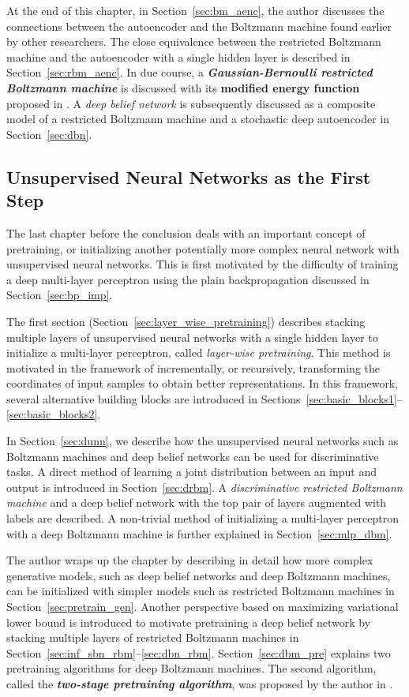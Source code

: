 \documentclass[dissertation,nocontribution,draft*]{aaltoseries}
\begin{document}
At the end of this chapter, in Section~\ref{sec:bm_aenc},
the author discusses the connections between the autoencoder
and the Boltzmann machine found earlier by other
researchers. The close equivalence between the restricted
Boltzmann machine and the autoencoder with a single hidden
layer is described in Section~\ref{sec:rbm_aenc}. In due
course, a \textbf{\textit{Gaussian-Bernoulli restricted
Boltzmann machine}} is discussed with its \textbf{modified
energy function} proposed in . A
\textit{deep belief network} is subsequently discussed as a
composite model of a restricted Boltzmann machine and a
stochastic deep autoencoder in Section~\ref{sec:dbn}.


\subsection{Unsupervised Neural Networks as the First Step}

The last chapter before the conclusion deals with an
important concept of pretraining, or initializing another
potentially more complex neural network with unsupervised
neural networks. This is first motivated by the difficulty
of training a deep multi-layer perceptron using the plain
backpropagation discussed in Section~\ref{sec:bp_imp}.

The first section (Section~\ref{sec:layer_wise_pretraining})
describes stacking multiple layers of unsupervised neural
networks with a single hidden layer to initialize a
multi-layer perceptron, called \textit{layer-wise
pretraining}. This method is motivated in the framework of
incrementally, or recursively, transforming the coordinates
of input samples to obtain better representations. In this
framework, several alternative building blocks are
introduced in
Sections~\ref{sec:basic_blocks1}--\ref{sec:basic_blocks2}.

In Section~\ref{sec:dunn}, we describe how the unsupervised
neural networks such as Boltzmann machines and deep belief
networks can be used for discriminative tasks. A direct
method of learning a joint distribution between an input and
output is introduced in Section~\ref{sec:drbm}. A
\textit{discriminative restricted Boltzmann machine} and a
deep belief network with the top pair of layers augmented
with labels are described. A non-trivial method of
initializing a multi-layer perceptron with a deep Boltzmann
machine is further explained in Section~\ref{sec:mlp_dbm}.

The author wraps up the chapter by describing in detail how
more complex generative models, such as deep belief networks
and deep Boltzmann machines, can be initialized with simpler
models such as restricted Boltzmann machines in
Section~\ref{sec:pretrain_gen}. Another perspective based on
maximizing variational lower bound is introduced to motivate
pretraining a deep belief network by stacking multiple
layers of restricted Boltzmann machines in
Section~\ref{sec:inf_sbn_rbm}--\ref{sec:dbn_rbm}.
Section~\ref{sec:dbm_pre}  explains two pretraining
algorithms for deep Boltzmann machines. The second
algorithm, called the \textbf{\textit{two-stage pretraining
algorithm}}, was proposed by the author in
.
\end{document}
